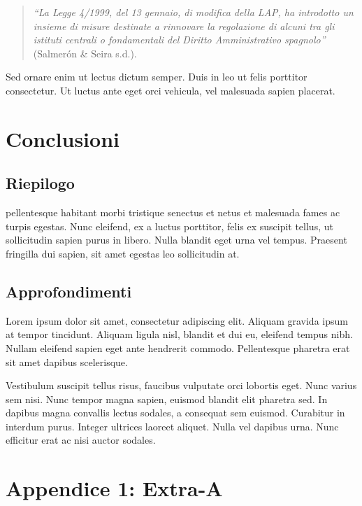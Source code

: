\documentclass[12pt,it,a4paper,]{report}
\begin{document}
\begin{quote}
\emph{``La Legge 4/1999, del 13 gennaio, di modifica della LAP, ha
introdotto un insieme di misure destinate a rinnovare la regolazione di
alcuni tra gli istituti centrali o fondamentali del Diritto
Amministrativo spagnolo''} (Salmerón \& Seira s.d.).
\end{quote}

Sed ornare enim ut lectus dictum semper. Duis in leo ut felis porttitor
consectetur. Ut luctus ante eget orci vehicula, vel malesuada sapien
placerat.

\hypertarget{conclusioni}{%
\chapter{Conclusioni}\label{conclusioni}}

\hypertarget{riepilogo}{%
\section{Riepilogo}\label{riepilogo}}

pellentesque habitant morbi tristique senectus et netus et malesuada
fames ac turpis egestas. Nunc eleifend, ex a luctus porttitor, felis ex
suscipit tellus, ut sollicitudin sapien purus in libero. Nulla blandit
eget urna vel tempus. Praesent fringilla dui sapien, sit amet egestas
leo sollicitudin at.

\hypertarget{approfondimenti}{%
\section{Approfondimenti}\label{approfondimenti}}

Lorem ipsum dolor sit amet, consectetur adipiscing elit. Aliquam gravida
ipsum at tempor tincidunt. Aliquam ligula nisl, blandit et dui eu,
eleifend tempus nibh. Nullam eleifend sapien eget ante hendrerit
commodo. Pellentesque pharetra erat sit amet dapibus scelerisque.

Vestibulum suscipit tellus risus, faucibus vulputate orci lobortis eget.
Nunc varius sem nisi. Nunc tempor magna sapien, euismod blandit elit
pharetra sed. In dapibus magna convallis lectus sodales, a consequat sem
euismod. Curabitur in interdum purus. Integer ultrices laoreet aliquet.
Nulla vel dapibus urna. Nunc efficitur erat ac nisi auctor sodales.

\hypertarget{appendice-1-extra-a}{%
\chapter*{Appendice 1: Extra-A}\label{appendice-1-extra-a}}
\end{document}
